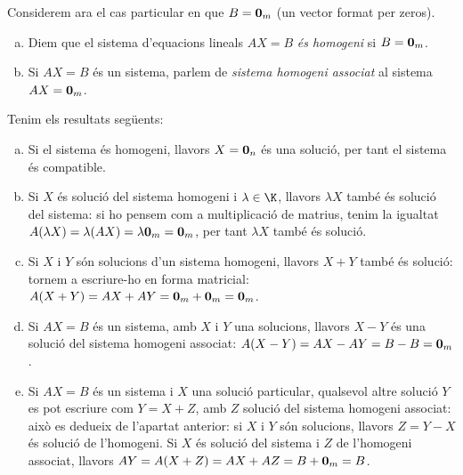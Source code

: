 Considerem ara el cas particular en que $B=\mathbf{0}_m$ (un vector format per zeros).
\begin{definicio}
	\begin{enumerate}[(a)]
		\item Diem que el sistema d'equacions lineals $AX=B$ \emph{és homogeni} si $B=\mathbf{0}_m$.
		\item Si $AX=B$ és un sistema, parlem de \emph{sistema homogeni associat} al sistema $AX=\mathbf{0}_m$.
	\end{enumerate}
\end{definicio}
Tenim els resultats següents:
\begin{enumerate}[(a)]
	\item Si el sistema és homogeni, llavors $X=\mathbf{0}_n$ és una solució, per tant el sistema és compatible.
	\item Si $X$ és solució del sistema homogeni i $\lambda\in\K$, llavors $\lambda X$ també és solució del sistema: si ho pensem com a multiplicació de matrius, tenim la igualtat $A(\lambda X)=\lambda (AX)=\lambda \mathbf{0}_m=\mathbf{0}_m$, per tant $\lambda X$ també és solució.
	\item Si $X$ i $Y$ són solucions d'un sistema homogeni, llavors $X+Y$ també és solució: tornem a escriure-ho en forma matricial: $A(X+Y)=AX+AY=\mathbf{0}_m+\mathbf{0}_m=\mathbf{0}_m$.
	\item Si $AX=B$ és un sistema, amb $X$ i $Y$ una solucions, llavors $X-Y$ és una solució del sistema homogeni associat: $A(X-Y)=AX-AY=B-B=\mathbf{0}_m$.
	\item Si $AX=B$ és un sistema i $X$ una solució particular, qualsevol altre solució $Y$ es pot escriure com $Y=X+Z$, amb $Z$ solució del sistema homogeni associat: això es dedueix de l'apartat anterior: si $X$ i $Y$ són solucions, llavors $Z=Y-X$ és solució de l'homogeni. Si $X$ és solució del sistema i $Z$ de l'homogeni associat, llavors $AY=A(X+Z)=AX+AZ=B+\mathbf{0}_m=B$.
\end{enumerate}
